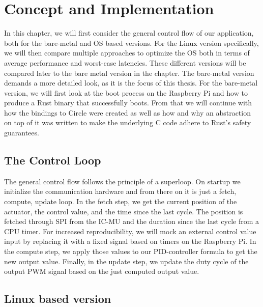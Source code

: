 
\chapter{Concept and Implementation}
\label{chap:concept_and_implementation}

In this chapter, we will first consider the general control flow of our application, both for the bare-metal and OS based versions.
For the Linux version specifically, we will then compare multiple approaches to optimize the OS both in terms of average performance and worst-case latencies.
These different versions will be compared later to the bare metal version in the  chapter.
The bare-metal version demands a more detailed look, as it is the focus of this thesis.
For the bare-metal version, we will first look at the boot process on the Raspberry Pi and how to produce a Rust binary that successfully boots.
From that we will continue with how the bindings to Circle were created as well as how and why an abstraction on top of it was written to make the underlying C code adhere to Rust's safety guarantees.

\section{The Control Loop}
\label{sec:concept_and_implementation:control_flow}

The general control flow follows the principle of a superloop.
On startup we initialize the communication hardware and from there on it is just a fetch, compute, update loop.
In the fetch step, we get the current position of the actuator, the control value, and the time since the last cycle.
The position is fetched through SPI from the IC-MU and the duration since the last cycle from a CPU timer.
For increased reproducibility, we will mock an external control value input by replacing it with a fixed signal based on timers on the Raspberry Pi.
In the compute step, we apply those values to our PID-controller formula to get the new output value.
Finally, in the update step, we update the duty cycle of the output PWM signal based on the just computed output value.

\section{Linux based version}
\label{sec:concept_and_implementation:linux}

